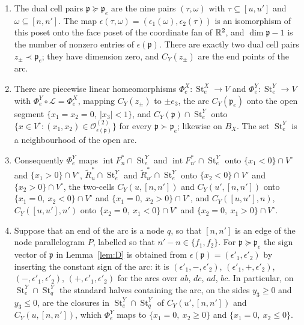 \begin{lemma}\label{lem:arc}
\begin{enumerate}
\item The dual cell pairs ${\mathfrak p}\succeq {\mathfrak p}_e$ are the nine pairs $(\tau,\omega)$ with $\tau\subseteq[u,u']$ and
$\omega\subseteq[n,n']$. The map $\epsilon(\tau,\omega)=(\epsilon_1(\omega),\epsilon_2(\tau))$ is an isomorphism of this
poset onto the face poset of the coordinate fan of $\mathbb R^2$, and $\dim{\mathfrak p}-1$ is the number of nonzero entries of $\epsilon({\mathfrak p})$.
There are exactly two dual cell pairs $z_\pm\prec {\mathfrak p}_e$; they have dimension zero, and $C_Y(z_\pm)$ are the end points of the arc.
\item There are piecewise linear homeomorphisms $\Phi^X_e\colon\operatorname{St}^X_e\to V$ and
$\Phi^Y_e\colon\operatorname{St}^Y_e\to V$ with $\Phi^Y_e\circ\mathcal L=\Phi^X_e$, mapping $C_Y(z_\pm)$ to $\pm e_3$, the arc
$C_Y({\mathfrak p}_e)$ onto the open segment $\{x_1=x_2=0,\ |x_3|<1\}$, and $C_Y({\mathfrak p})\cap\operatorname{St}^Y_e$ onto
$\{x\in V^\circ:(x_1,x_2)\in\mathcal O^{(2)}_{\epsilon({\mathfrak p})}\}$ for every ${\mathfrak p}\succ {\mathfrak p}_e$; likewise on $B_X$. The set
$\operatorname{St}^Y_e$ is a neighbourhood of the open arc.
\item Consequently $\Phi^Y_e$ maps $\operatorname{int}F^*_n\cap\operatorname{St}^Y_e$ and
$\operatorname{int}F^*_{n'}\cap\operatorname{St}^Y_e$ onto $\{x_1<0\}\cap V^\circ$ and $\{x_1>0\}\cap V^\circ$, $\widetilde
R^*_u\cap\operatorname{St}^Y_e$ and $\widetilde R^*_{u'}\cap\operatorname{St}^Y_e$ onto $\{x_2<0\}\cap V^\circ$ and
$\{x_2>0\}\cap V^\circ$, the two-cells $C_Y(u,[n,n'])$ and $C_Y(u',[n,n'])$ onto $\{x_1=0,\ x_2<0\}\cap V^\circ$ and
$\{x_1=0,\ x_2>0\}\cap V^\circ$, and $C_Y([u,u'],n)$, $C_Y([u,u'],n')$ onto $\{x_2=0,\ x_1<0\}\cap V^\circ$ and
$\{x_2=0,\ x_1>0\}\cap V^\circ$.
\item Suppose that an end of the arc is a node $q$, so that $[n,n']$ is an edge of the node parallelogram $P$, labelled so
that $n'-n\in\{f_1,f_2\}$. For ${\mathfrak p}\succeq {\mathfrak p}_e$ the sign vector of ${\mathfrak p}$ in Lemma~\ref{lem:D} is obtained from
$\epsilon({\mathfrak p})=(\epsilon'_1,\epsilon'_2)$ by inserting the constant sign of the arc: it is $(\epsilon'_1,-,\epsilon'_2)$,
$(\epsilon'_1,+,\epsilon'_2)$, $(-,\epsilon'_1,\epsilon'_2)$, $(+,\epsilon'_1,\epsilon'_2)$ for the arcs over $ab$, $dc$,
$ad$, $bc$. In particular, on $\operatorname{St}^Y_e\cap\operatorname{St}^Y_q$ the standard halves containing the arc, on
the sides $y_3\ge0$ and $y_3\le0$, are the closures in $\operatorname{St}^Y_e\cap\operatorname{St}^Y_q$ of $C_Y(u',[n,n'])$
and $C_Y(u,[n,n'])$, which $\Phi^Y_e$ maps to $\{x_1=0,\ x_2\ge0\}$ and $\{x_1=0,\ x_2\le0\}$.
\end{enumerate}
\end{lemma}
